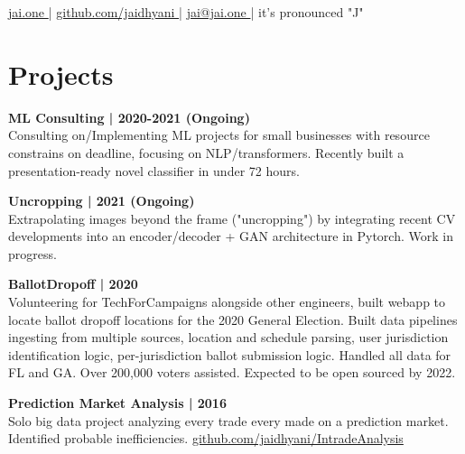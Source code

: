 \documentclass[]{resume}
\begin{document}
%
%
\lastupdated
\github

%
%
{ 
    \href{http://jai.one }{jai.one }|
    \href{http://github.com/jaidhyani}{ github.com/jaidhyani }|
    \href{mailto:jai@jai.one}{ jai@jai.one }|
    it's pronounced "J"
}

%
%

\begin{minipage}[t]{0.33\textwidth}



\sectionsep


\section{Projects}

\sectionsep

\textbf{ML Consulting | 2020-2021 (Ongoing)}\\
Consulting on/Implementing ML projects for small businesses with
resource constrains on deadline, focusing on NLP/transformers. 
Recently built a presentation-ready novel classifier in under 72 hours.
\sectionsep


\textbf{Uncropping | 2021 (Ongoing)}\\
Extrapolating images beyond the frame ("uncropping") by integrating recent CV developments
into an encoder/decoder + GAN architecture in Pytorch. Work in progress.
\sectionsep

\textbf{BallotDropoff | 2020}\\
Volunteering for TechForCampaigns alongside other engineers, 
built webapp to locate  ballot dropoff locations for 
the 2020 General Election. Built data pipelines ingesting from 
multiple sources, location and schedule parsing, user jurisdiction 
identification logic, per-jurisdiction ballot submission logic. 
Handled all data for FL and GA. Over 200,000 voters assisted.
Expected to be open sourced by 2022.
\sectionsep

\textbf{Prediction Market Analysis | 2016}\\
Solo big data project analyzing every trade every made on a prediction market. Identified
probable inefficiencies.
\href{http://github.com/jaidhyani/IntradeAnalysis}{github.com/jaidhyani/IntradeAnalysis }
\sectionsep


\end{minipage}
\end{document}
